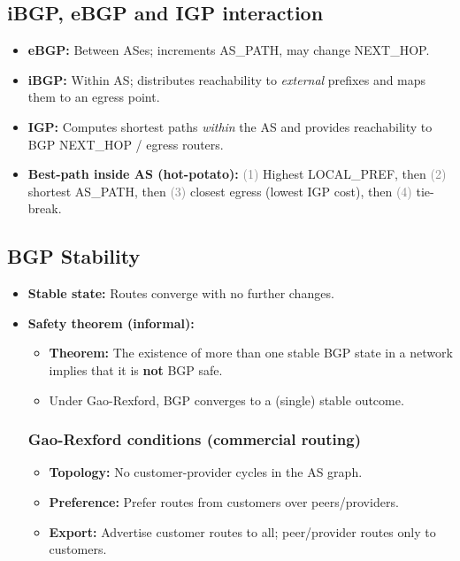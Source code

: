 \subsection{iBGP, eBGP and IGP interaction}
\begin{itemize}
    \item \textbf{eBGP:} Between ASes; increments AS\_PATH, may change NEXT\_HOP.
    \item \textbf{iBGP:} Within AS; distributes reachability to \textit{external} prefixes and maps them to an egress point.
    \item \textbf{IGP:} Computes shortest paths \textit{within} the AS and provides reachability to BGP NEXT\_HOP / egress routers.
    \item \textbf{Best-path inside AS (hot-potato):} \textcolor{gray}{(1)} Highest LOCAL\_PREF, then \textcolor{gray}{(2)} shortest AS\_PATH, then \textcolor{gray}{(3)} closest egress (lowest IGP cost), then \textcolor{gray}{(4)} tie-break.
\end{itemize}

\subsection{BGP Stability}
\begin{itemize}
    \item \textbf{Stable state:} Routes converge with no further changes.
    \item \textbf{Safety theorem (informal):}
    \begin{itemize}
		\item \textbf{Theorem:} The existence of more than one stable BGP state in a network implies that it is \textbf{not} BGP safe.
        \item Under Gao-Rexford, BGP converges to a (single) stable outcome.
    \end{itemize}
    \subsubsection{Gao-Rexford conditions (commercial routing)}
    \begin{itemize}
        \item \textbf{Topology:}  No customer-provider cycles in the AS graph.
        \item \textbf{Preference:} Prefer routes from customers over peers/providers.
        \item \textbf{Export:} Advertise customer routes to all; peer/provider routes only to customers.
    \end{itemize}
\end{itemize}

